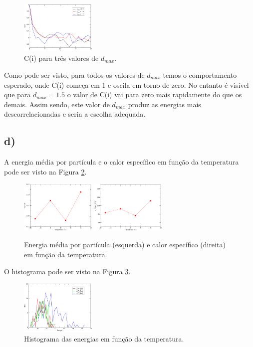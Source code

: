 \documentclass[a4wide]{report}
\begin{document}
\begin{figure}[!htb]
\centering
\includegraphics[width=0.32\textwidth]{ci.pdf}
\caption{C(i) para três valores de $d_{max}$.}
\label{3c}
\end{figure}

Como pode ser visto, para todos os valores de $d_{max}$ temos o comportamento esperado, onde C(i) começa em 1 e oscila em torno de zero. No entanto é visível que para $d_{max} = 1.5$ o valor de C(i) vai para zero mais rapidamente do que os demais. Assim sendo, este valor de $d_{max}$ produz as energias mais descorrelacionadas e seria a escolha adequada.


\subsection*{d)}
A energia média por partícula e o calor específico em função da temperatura pode ser visto na Figura \ref{1d}.

\begin{figure}[!htb]
\centering
\includegraphics[width=0.32\textwidth]{energia.pdf}
\includegraphics[width=0.32\textwidth]{cv.pdf}
\caption{Energia média por partícula (esquerda) e calor específico (direita) em função da temperatura.}
\label{1d}
\end{figure}

O histograma pode ser visto na Figura \ref{2d}.
\begin{figure}[!htb]
\centering
\includegraphics[width=0.32\textwidth]{hist30.pdf}
\caption{Histograma das energias em função da temperatura.}
\label{2d}
\end{figure}
\end{document}
